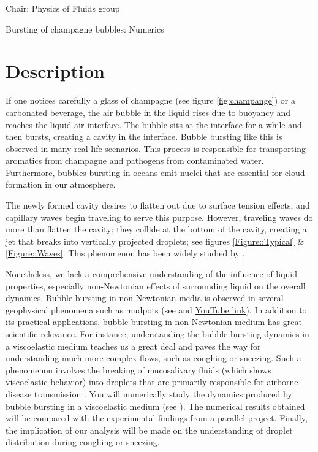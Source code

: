 \documentclass[a4paper,10pt]{article}
\begin{document}
\noindent Chair: Physics of Fluids group
\begin{center}
 \begin{LARGE}
  Bursting of champagne bubbles: Numerics
 \end{LARGE}
\end{center}
\section*{Description}
If one notices carefully a glass of champagne (see figure \ref{fig:champange}) or a carbonated beverage, the air bubble in the liquid rises due to buoyancy and reaches the liquid-air interface. The bubble sits at the interface for a while and then bursts, creating a cavity in the interface. Bubble bursting like this is observed in many real-life scenarios. This process is responsible for transporting aromatics from champagne and pathogens from contaminated water. Furthermore, bubbles bursting in oceans emit nuclei that are essential for cloud formation in our atmosphere. 

The newly formed cavity desires to flatten out due to surface tension effects, and capillary waves begin traveling to serve this purpose. However, traveling waves do more than flatten the cavity; they collide at the bottom of the cavity, creating a jet that breaks into vertically projected droplets; see figures \ref{Figure::Typical} \& \ref{Figure::Waves}. This phenomenon has been widely studied by \citet{duchemin2002jet, walls2015jet, deike2018dynamics, gordillo2019capillary}.

Nonetheless, we lack a comprehensive understanding of the influence of liquid properties, especially non-Newtonian effects of surrounding liquid on the overall dynamics. Bubble-bursting in non-Newtonian media is observed in several geophysical phenomena such as mudpots (see \citet{sanjay_lohse_jalaal_2021} and \href{https://www.youtube.com/watch?v=a9hUsVq9q7U}{YouTube link}). In addition to its practical applications, bubble-bursting in non-Newtonian medium has great scientific relevance. For instance, understanding the bubble-bursting dynamics in a viscoelastic medium teaches us a great deal and paves the way for understanding much more complex flows, such as coughing or sneezing. Such a phenomenon involves the breaking of mucosalivary fluids (which shows viscoelastic behavior) into droplets that are primarily responsible for airborne disease transmission \citep{walls2017quantifying, bourouiba2021fluid}. You will numerically study the dynamics produced by bubble bursting in a viscoelastic medium (see \citet{dixit2024viscoelastic}). The numerical results obtained will be compared with the experimental findings from a parallel project. Finally, the implication of our analysis will be made on the understanding of droplet distribution during coughing or sneezing. 
\end{document}
